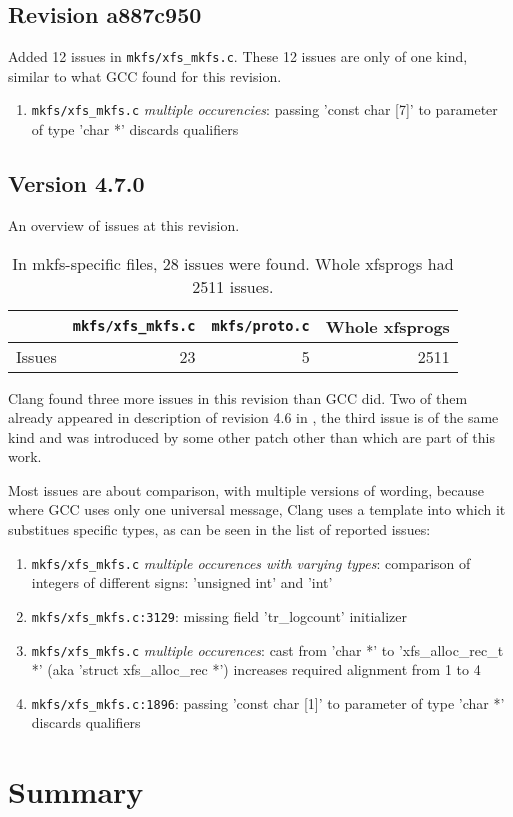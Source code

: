 \subsection{Revision a887c950}
Added 12 issues in {\tt mkfs/xfs\_mkfs.c}. These 12 issues are only of one
kind, similar to what GCC found for this revision.

\begin{enumerate}
	\item {\tt mkfs/xfs\_mkfs.c} {\em multiple occurencies}: passing
		'const char [7]' to parameter of type 'char *' discards
		qualifiers
\end{enumerate}

\subsection{Version 4.7.0}\label{chap:results:clang:4.7}

An overview of issues at this revision.
\begin{table}[h]
\begin{tabular}{|l||r|r||r|}
\hline
& {\tt mkfs/xfs\_mkfs.c} & {\tt mkfs/proto.c} & Whole xfsprogs \\
\hline
Issues & 23 & 5 & 2511 \\
\hline
\end{tabular}
\caption{In mkfs-specific files, 28 issues were found. Whole
xfsprogs had 2511 issues.}
\end{table}

Clang found three more issues in this revision than GCC did. Two of them
already appeared in description of revision 4.6 in
, the third issue is of the same kind and was
introduced by some other patch other than which are part of this work.

Most issues are about comparison, with multiple versions of wording, because
where GCC uses only one universal message, Clang uses a template into which it
substitues specific types, as can be seen in the list of reported issues:
\begin{enumerate}
	\item {\tt mkfs/xfs\_mkfs.c} {\em multiple occurences with varying
		types}: comparison of integers of different signs: 'unsigned
		int' and 'int'
	\item {\tt mkfs/xfs\_mkfs.c:3129}: missing field 'tr\_logcount'
		initializer
	\item {\tt mkfs/xfs\_mkfs.c} {\em multiple occurences}: cast from 'char *' to
		'xfs\_alloc\_rec\_t *' (aka 'struct xfs\_alloc\_rec *')
		increases required alignment from 1 to 4
	\item {\tt mkfs/xfs\_mkfs.c:1896}: passing 'const char [1]' to
		parameter of type 'char *' discards qualifiers
\end{enumerate}


\section{Summary}\label{chap:results:summary}


